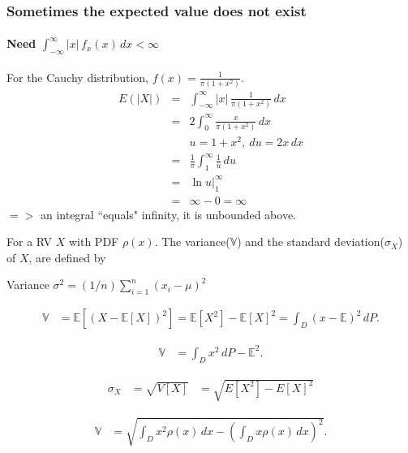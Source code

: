 \documentclass{beamer}
\begin{document}


\begin{frame}
\frametitle{Sometimes the expected value does not exist}
\framesubtitle{Need $ \int_{-\infty}^\infty |x| \, f_x(x) \, dx < \infty$}  
For the Cauchy distribution, $f(x) = \frac{1}{\pi(1+x^2)}$.  
\begin{eqnarray*}
E(|X|) & = & \int_{-\infty}^\infty |x| \, \frac{1}{\pi(1+x^2)} \, dx \\ 
& = & 2 \int_0^\infty \frac{x}{\pi(1+x^2)} \, dx \\ 
&& u = 1+x^2, ~du = 2x \, dx \\  
& = & \frac{1}{\pi} \int_1^\infty \frac{1}{u} \, du \\ 
& = & \ln u |_1^\infty \\ 
& = & \infty - 0 = \infty 
\end{eqnarray*} 
$=>$ an integral ``equals" infinity, it is unbounded above.
\end{frame}


\begin{frame}

For a RV $X$ with PDF $\rho(x)$. The variance($\mathbb{V}$) and the standard deviation($\sigma_X$) of $X$, are defined by

Variance   $\sigma^2 = (1/n)\sum_{i=1}^{n}(x_i - \mu)^2$

\begin{align*} \mathbb{V} &= \mathbb{E}\left[ \left( X-\mathbb{E}[X] \right)^2 \right]
=\mathbb{E}[X^2] - \mathbb{E}[X]^2
= \int_D (x-\mathbb{E})^2 \, dP. \end{align*}

\begin{align*} \mathbb{V} &= \int_D x^2 \, dP - \mathbb{E}^2. \end{align*} 

\begin{align*}\sigma_X&=\sqrt{V[X]}
&=\sqrt{E[X^2]-E[X]^2}
\end{align*}

\begin{align*} \mathbb{V} &=\sqrt{\int_D x^2\rho(x)\,dx - \left(\int_D x\rho(x) \,dx\right)^2}. \end{align*}


\end{frame}
\end{document}
